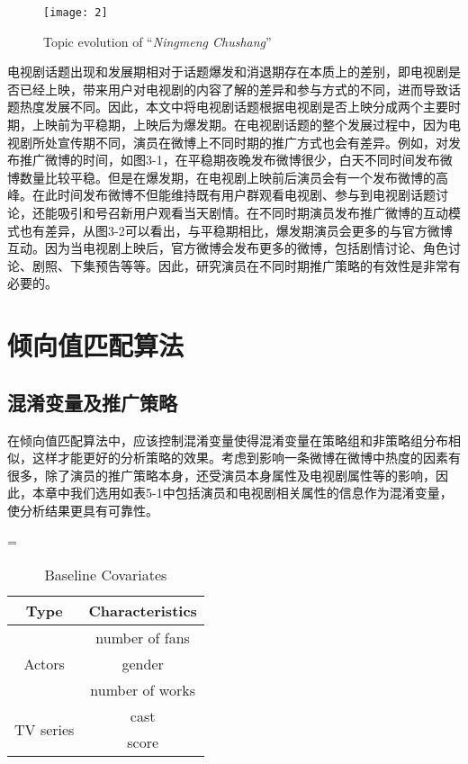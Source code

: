 \begin{figure}[!htbp]
\centering
\texttt{[image: 2]}
\caption{Topic evolution of ``\textit{Ningmeng Chushang}''}
\end{figure}

电视剧话题出现和发展期相对于话题爆发和消退期存在本质上的差别，即电视剧是否已经上映，带来用户对电视剧的内容了解的差异和参与方式的不同，进而导致话题热度发展不同。因此，本文中将电视剧话题根据电视剧是否上映分成两个主要时期，上映前为平稳期，上映后为爆发期。在电视剧话题的整个发展过程中，因为电视剧所处宣传期不同，演员在微博上不同时期的推广方式也会有差异。例如，对发布推广微博的时间，如图3-1，在平稳期夜晚发布微博很少，白天不同时间发布微博数量比较平稳。但是在爆发期，在电视剧上映前后演员会有一个发布微博的高峰。在此时间发布微博不但能维持既有用户群观看电视剧、参与到电视剧话题讨论，还能吸引和号召新用户观看当天剧情。在不同时期演员发布推广微博的互动模式也有差异，从图3-2可以看出，与平稳期相比，爆发期演员会更多的与官方微博互动。因为当电视剧上映后，官方微博会发布更多的微博，包括剧情讨论、角色讨论、剧照、下集预告等等。因此，研究演员在不同时期推广策略的有效性是非常有必要的。

\section{倾向值匹配算法}
\subsection{混淆变量及推广策略}
在倾向值匹配算法中，应该控制混淆变量使得混淆变量在策略组和非策略组分布相似，这样才能更好的分析策略的效果。考虑到影响一条微博在微博中热度的因素有很多，除了演员的推广策略本身，还受演员本身属性及电视剧属性等的影响，因此，本章中我们选用如表5-1中包括演员和电视剧相关属性的信息作为混淆变量，使分析结果更具有可靠性。

\begin{table}[!htbp]
\centering
\caption{Baseline Covariates}=
\begin{tabular}{|c|c|} \hline
Type & Characteristics\\ \hline
\multirow{3}{*}{Actors} & number of fans\\%
& gender\\%
& number of works\\ \hline
\multirow{2}{*}{TV series} & cast\\%
&score \\ \hline
\end{tabular}
\end{table}

